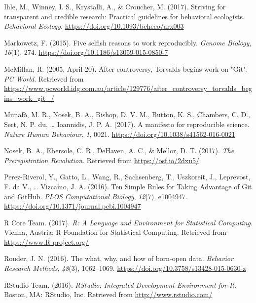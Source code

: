 \documentclass[
  american,
  ,doc,floatsintext]{apa6}
\begin{document}
\leavevmode\hypertarget{ref-ihle_striving_2017}{}%
Ihle, M., Winney, I. S., Krystalli, A., \& Croucher, M. (2017). Striving for transparent and credible research: Practical guidelines for behavioral ecologists. \emph{Behavioral Ecology}. \url{https://doi.org/10.1093/beheco/arx003}

\leavevmode\hypertarget{ref-markowetz_five_2015}{}%
Markowetz, F. (2015). Five selfish reasons to work reproducibly. \emph{Genome Biology}, \emph{16}(1), 274. \url{https://doi.org/10.1186/s13059-015-0850-7}

\leavevmode\hypertarget{ref-mcmillan_after_2005}{}%
McMillan, R. (2005, April 20). After controversy, Torvalds begins work on "Git". \emph{PC World}. Retrieved from \url{https://www.pcworld.idg.com.au/article/129776/after_controversy_torvalds_begins_work_git_/}

\leavevmode\hypertarget{ref-munafo_manifesto_2017}{}%
Munafò, M. R., Nosek, B. A., Bishop, D. V. M., Button, K. S., Chambers, C. D., Sert, N. P. du, \ldots{} Ioannidis, J. P. A. (2017). A manifesto for reproducible science. \emph{Nature Human Behaviour}, \emph{1}, 0021. \url{https://doi.org/10.1038/s41562-016-0021}

\leavevmode\hypertarget{ref-nosek_preregistration_2017}{}%
Nosek, B. A., Ebersole, C. R., DeHaven, A. C., \& Mellor, D. T. (2017). \emph{The Preregistration Revolution}. Retrieved from \url{https://osf.io/2dxu5/}

\leavevmode\hypertarget{ref-perez-riverol_ten_2016}{}%
Perez-Riverol, Y., Gatto, L., Wang, R., Sachsenberg, T., Uszkoreit, J., Leprevost, F. da V., \ldots{} Vizcaíno, J. A. (2016). Ten Simple Rules for Taking Advantage of Git and GitHub. \emph{PLOS Computational Biology}, \emph{12}(7), e1004947. \url{https://doi.org/10.1371/journal.pcbi.1004947}

\leavevmode\hypertarget{ref-r_core_team_r:_2017}{}%
R Core Team. (2017). \emph{R: A Language and Environment for Statistical Computing}. Vienna, Austria: R Foundation for Statistical Computing. Retrieved from \url{https://www.R-project.org/}

\leavevmode\hypertarget{ref-rouder_what_2016}{}%
Rouder, J. N. (2016). The what, why, and how of born-open data. \emph{Behavior Research Methods}, \emph{48}(3), 1062--1069. \url{https://doi.org/10.3758/s13428-015-0630-z}

\leavevmode\hypertarget{ref-rstudio_team_rstudio:_2016}{}%
RStudio Team. (2016). \emph{RStudio: Integrated Development Environment for R}. Boston, MA: RStudio, Inc. Retrieved from \url{http://www.rstudio.com/}
\end{document}
